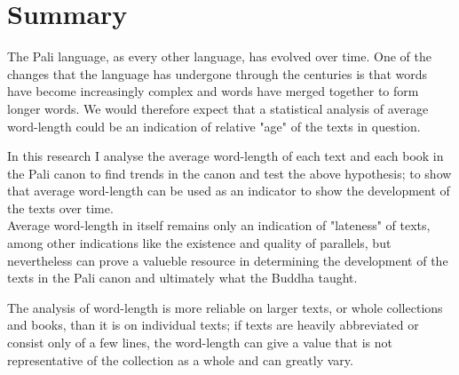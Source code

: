 \section{Summary}
The Pali language, as every other language, has evolved over time. One of the changes that the language has undergone through the centuries is that words have become increasingly complex and words have merged together to form longer words. We would therefore expect that a statistical analysis of average word-length could be an indication of relative "age" of the texts in question. 

In this research I analyse the average word-length of each text and each book in the Pali canon to find trends in the canon and test the above hypothesis; to show that average word-length can be used as an indicator to show the development of the texts over time.\\

Average word-length in itself remains only an indication of "lateness" of texts, among other indications like the existence and quality of parallels, but nevertheless can prove a valueble resource in determining the development of the texts in the Pali canon and ultimately what the Buddha taught.

The analysis of word-length is more reliable on larger texts, or whole collections and books, than it is on individual texts; if texts are heavily abbreviated or consist only of a few lines, the word-length can give a value that is not representative of the collection as a whole and can greatly vary.
